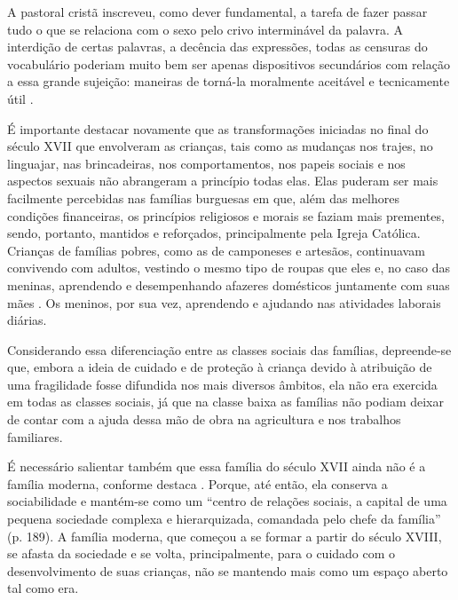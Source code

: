 \begin{citacao}
	A pastoral cristã inscreveu, como dever fundamental, a tarefa de fazer passar tudo o que se relaciona com o sexo pelo crivo interminável da palavra. A interdição de certas palavras, a decência das expressões, todas as censuras do vocabulário poderiam muito bem ser apenas dispositivos secundários com relação a essa grande sujeição: maneiras de torná-la moralmente aceitável e tecnicamente útil \cite[p. 24]{FOUCAULT1988}.
\end{citacao}

É importante destacar novamente que as transformações iniciadas no final do século XVII que envolveram as crianças, tais como as mudanças nos trajes, no linguajar, nas brincadeiras, nos comportamentos, nos papeis sociais e nos aspectos sexuais não abrangeram a princípio todas elas. Elas puderam ser mais facilmente percebidas nas famílias burguesas em que, além das melhores condições financeiras, os princípios religiosos e morais se faziam mais prementes, sendo, portanto, mantidos e reforçados, principalmente pela Igreja Católica. Crianças de famílias pobres, como as de camponeses e artesãos, continuavam convivendo com adultos, vestindo o mesmo tipo de roupas que eles e, no caso das meninas, aprendendo e desempenhando afazeres domésticos juntamente com suas mães \cite{ARIES2011}. Os meninos, por sua vez, aprendendo e ajudando nas atividades laborais diárias.

Considerando essa diferenciação entre as classes sociais das famílias, depreende-se que, embora a ideia de cuidado e de proteção à criança devido à atribuição de uma fragilidade fosse difundida nos mais diversos âmbitos, ela não era exercida em todas as classes sociais, já que na classe baixa as famílias não podiam deixar de contar com a ajuda dessa mão de obra na agricultura e nos trabalhos familiares\footnotemark.



É necessário salientar também que essa família do século XVII ainda não é a família moderna, conforme destaca . Porque, até então, ela conserva a sociabilidade e mantém-se como um ``centro de relações sociais, a capital de uma pequena sociedade complexa e hierarquizada, comandada pelo chefe da família'' (p. 189). A família moderna, que começou a se formar a partir do século XVIII, se afasta da sociedade e se volta, principalmente, para o cuidado com o desenvolvimento de suas crianças, não se mantendo mais como um espaço aberto tal como era.


